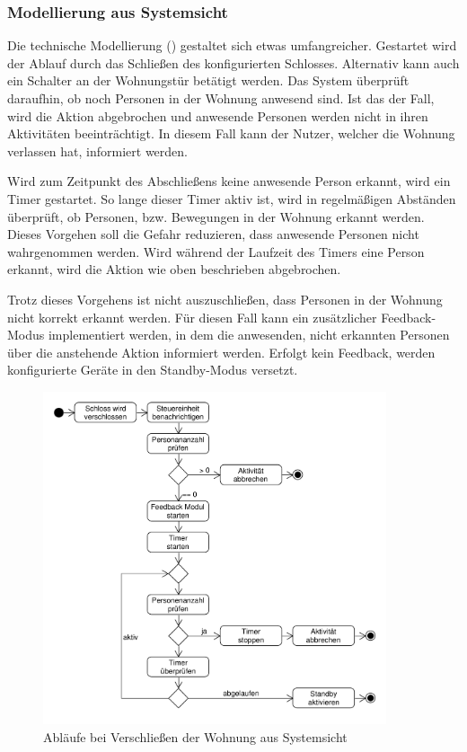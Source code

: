 \subsubsection{Modellierung aus Systemsicht}
Die technische Modellierung () gestaltet sich etwas umfangreicher. Gestartet wird der Ablauf durch das Schließen des konfigurierten Schlosses. Alternativ kann auch ein Schalter an der Wohnungstür betätigt werden. Das System überprüft daraufhin, ob noch Personen in der Wohnung anwesend sind. Ist das der Fall, wird die Aktion abgebrochen und anwesende Personen werden nicht in ihren Aktivitäten beeinträchtigt. In diesem Fall kann der Nutzer, welcher die Wohnung verlassen hat, informiert werden.

Wird zum Zeitpunkt des Abschließens keine anwesende Person erkannt, wird ein Timer gestartet. So lange dieser Timer aktiv ist, wird in regelmäßigen Abständen überprüft, ob Personen, bzw. Bewegungen in der Wohnung erkannt werden. Dieses Vorgehen soll die Gefahr reduzieren, dass anwesende Personen nicht wahrgenommen werden. Wird während der Laufzeit des Timers eine Person erkannt, wird die Aktion wie oben beschrieben abgebrochen.

Trotz dieses Vorgehens ist nicht auszuschließen, dass Personen in der Wohnung nicht korrekt erkannt werden. Für diesen Fall kann ein zusätzlicher Feedback-Modus implementiert werden, in dem die anwesenden, nicht erkannten Personen über die anstehende Aktion informiert werden. Erfolgt kein Feedback, werden konfigurierte Geräte in den Standby-Modus versetzt.

\begin{figure}[h!]
	\centering
	\includegraphics[width=0.9\textwidth]{img/Szenarien/WohnungSchliessen.pdf}
	\caption{Abläufe bei Verschließen der Wohnung aus Systemsicht}
	\label{fig:szenarienStandby}
\end{figure}

